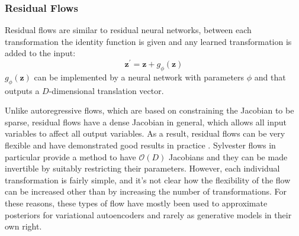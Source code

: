 \documentclass[english]{scrartcl}
\begin{document}

    \subsubsection{Residual Flows}
    Residual flows are similar to residual neural networks, between each transformation the identity function is given and any learned transformation is added to the input:
    \begin{equation}
        \label{eq:res_flow_eq}
        \textbf{z}^{\prime} = \textbf{z} + g_{\phi} (\textbf{z})
    \end{equation}
    $g_{\phi} (\textbf{z})$ can be implemented by a neural network with parameters $\phi$ and that outputs a $D$-dimensional translation vector.

    Unlike autoregressive flows, which are based on constraining the Jacobian to be sparse, residual flows have a dense Jacobian in general, which allows all input variables to affect all output variables.
    As a result, residual flows can be very flexible and have demonstrated good results in practice \citep{chen_residual_2020}.
    Sylvester flows \citep{berg_sylvester_2019} in particular provide a method to have $\mathcal{O}(D)$ Jacobians and they can be made invertible by suitably restricting their parameters.
    However, each individual transformation is fairly simple, and it's not clear how the flexibility of the flow can be increased other than by increasing the number of transformations.
    For these reasons, these types of flow have mostly been used to approximate posteriors for variational autoencoders and rarely as generative models in their own right.
\end{document}
